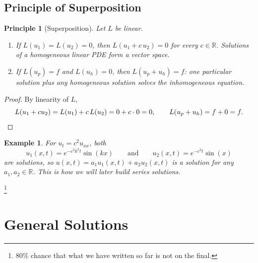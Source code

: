 \documentclass{article}
\newtheorem*{example}{Example}
\newtheorem{principle}{Principle}
\begin{document}
\subsection{Principle of Superposition}
\begin{principle}[Superposition]
    Let $L$ be linear.
    \begin{enumerate}[label=(\arabic*)]
        \item If $L(u_1) = L(u_2) = 0$, then $L(u_1 + c\,u_2) = 0$ for every $c \in \mathbb{R}$. Solutions of a homogeneous linear PDE form a vector space.
        \item If $L(u_p) = f$ and $L(u_h) = 0$, then $L(u_p + u_h) = f$: one particular solution plus any homogeneous solution solves the inhomogeneous equation.
    \end{enumerate}
\end{principle}
\begin{proof}
    By linearity of $L$,
    \begin{equation}
        L(u_1 + c u_2) = L(u_1) + c\,L(u_2) = 0 + c \cdot 0 = 0,
        \qquad
        L(u_p + u_h) = f + 0 = f. \qedhere
    \end{equation}
\end{proof}
\begin{example}
    For $u_t = c^2 u_{xx}$, both
    \begin{equation}
        u_1(x,t) = e^{-c^2k^2t}\sin(kx)
        \qquad \text{and} \qquad
        u_2(x,t) = e^{-c^2 t}\sin(x)
    \end{equation}
    are solutions, so $u(x,t) = a_1 u_1(x,t) + a_2 u_2(x,t)$ is a solution for any $a_1, a_2 \in \mathbb{R}$. This is how we will later build series solutions.
\end{example}
\footnote{80\% chance that what we have written so far is not on the final.}


\section{General Solutions}
\end{document}
